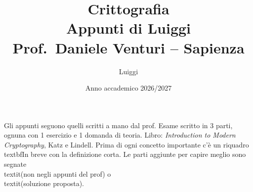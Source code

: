 \documentclass[11pt,a4paper]{report}
\title{\textbf{Crittografia}\\[0.5em]\large Appunti di Luiggi\\[0.3em]\normalsize Prof.\ Daniele Venturi -- Sapienza}
\author{Luiggi}
\date{Anno accademico 2026/2027}
\begin{document}
\maketitle

\noindent Gli appunti seguono quelli scritti a mano dal prof. Esame scritto in 3 parti, ognuna con 1 esercizio e 1 domanda di teoria. Libro: \textit{Introduction to Modern Cryptography}, Katz e Lindell. Prima di ogni concetto importante c'è un riquadro \\textbf{In breve} con la definizione corta. Le parti aggiunte per capire meglio sono segnate \\textit{(non negli appunti del prof)} o \\textit{(soluzione proposta)}.

\tableofcontents


















\appendix

\end{document}

